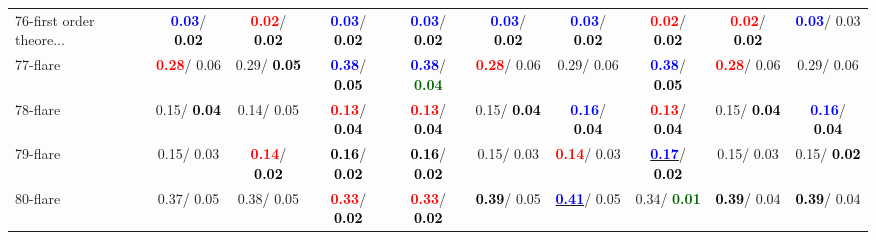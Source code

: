 \begin{table}[h]
\begin{center}
{\begin{tabular}{lc|c|c|c|c|c|c|c|c}
76-first order theore... & \textcolor{blue}{\textbf{  0.03}}/\textcolor{black}{\textbf{  0.02}} & \textcolor{red}{\textbf{  0.02}}/\textcolor{black}{\textbf{  0.02}} & \textcolor{blue}{\textbf{  0.03}}/\textcolor{black}{\textbf{  0.02}} & \textcolor{blue}{\textbf{  0.03}}/\textcolor{black}{\textbf{  0.02}} & \textcolor{blue}{\textbf{  0.03}}/\textcolor{black}{\textbf{  0.02}} & \textcolor{blue}{\textbf{  0.03}}/\textcolor{black}{\textbf{  0.02}} & \textcolor{red}{\textbf{  0.02}}/\textcolor{black}{\textbf{  0.02}} & \textcolor{red}{\textbf{  0.02}}/\textcolor{black}{\textbf{  0.02}} & \textcolor{blue}{\textbf{  0.03}}/  0.03 \\
77-flare & \textcolor{red}{\textbf{  0.28}}/  0.06 &   0.29/\textcolor{black}{\textbf{  0.05}} & \textcolor{blue}{\textbf{  0.38}}/\textcolor{black}{\textbf{  0.05}} & \textcolor{blue}{\textbf{  0.38}}/\textcolor{darkgreen}{\textbf{  0.04}} & \textcolor{red}{\textbf{  0.28}}/  0.06 &   0.29/  0.06 & \textcolor{blue}{\textbf{  0.38}}/\textcolor{black}{\textbf{  0.05}} & \textcolor{red}{\textbf{  0.28}}/  0.06 &   0.29/  0.06 \\
78-flare &   0.15/\textcolor{black}{\textbf{  0.04}} &   0.14/  0.05 & \textcolor{red}{\textbf{  0.13}}/\textcolor{black}{\textbf{  0.04}} & \textcolor{red}{\textbf{  0.13}}/\textcolor{black}{\textbf{  0.04}} &   0.15/\textcolor{black}{\textbf{  0.04}} & \textcolor{blue}{\textbf{  0.16}}/\textcolor{black}{\textbf{  0.04}} & \textcolor{red}{\textbf{  0.13}}/\textcolor{black}{\textbf{  0.04}} &   0.15/\textcolor{black}{\textbf{  0.04}} & \textcolor{blue}{\textbf{  0.16}}/\textcolor{black}{\textbf{  0.04}} \\ \hline
79-flare &   0.15/  0.03 & \textcolor{red}{\textbf{  0.14}}/\textcolor{black}{\textbf{  0.02}} & \textcolor{black}{\textbf{  0.16}}/\textcolor{black}{\textbf{  0.02}} & \textcolor{black}{\textbf{  0.16}}/\textcolor{black}{\textbf{  0.02}} &   0.15/  0.03 & \textcolor{red}{\textbf{  0.14}}/  0.03 & \underline{\textcolor{blue}{\textbf{  0.17}}}/\textcolor{black}{\textbf{  0.02}} &   0.15/  0.03 &   0.15/\textcolor{black}{\textbf{  0.02}} \\
80-flare &   0.37/  0.05 &   0.38/  0.05 & \textcolor{red}{\textbf{  0.33}}/\textcolor{black}{\textbf{  0.02}} & \textcolor{red}{\textbf{  0.33}}/\textcolor{black}{\textbf{  0.02}} & \textcolor{black}{\textbf{  0.39}}/  0.05 & \underline{\textcolor{blue}{\textbf{  0.41}}}/  0.05 &   0.34/\textcolor{darkgreen}{\textbf{  0.01}} & \textcolor{black}{\textbf{  0.39}}/  0.04 & \textcolor{black}{\textbf{  0.39}}/  0.04 \\

\end{tabular}}
\end{center}
\end{table}
